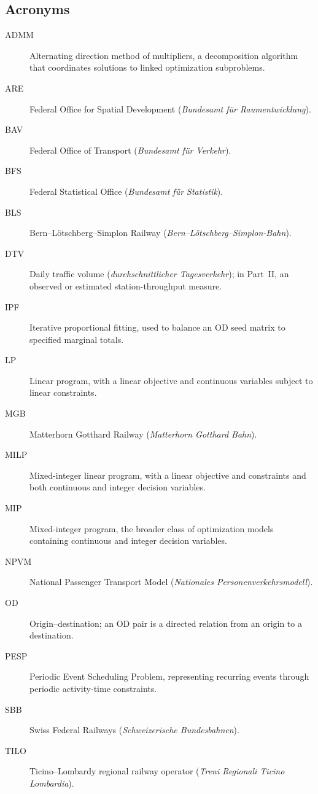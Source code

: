 \documentclass[preprint,12pt]{elsarticle}
\begin{document}
\subsection*{Acronyms}
\begin{description}
    \item[ADMM] Alternating direction method of multipliers, a decomposition algorithm that coordinates solutions to linked optimization subproblems.
    \item[ARE] Federal Office for Spatial Development (\textit{Bundesamt für Raumentwicklung}).
    \item[BAV] Federal Office of Transport (\textit{Bundesamt für Verkehr}).
    \item[BFS] Federal Statistical Office (\textit{Bundesamt für Statistik}).
    \item[BLS] Bern--Lötschberg--Simplon Railway (\textit{Bern--Lötschberg--Simplon-Bahn}).
    \item[DTV] Daily traffic volume (\textit{durchschnittlicher Tagesverkehr}); in Part~II, an observed or estimated station-throughput measure.
    \item[IPF] Iterative proportional fitting, used to balance an OD seed matrix to specified marginal totals.
    \item[LP] Linear program, with a linear objective and continuous variables subject to linear constraints.
    \item[MGB] Matterhorn Gotthard Railway (\textit{Matterhorn Gotthard Bahn}).
    \item[MILP] Mixed-integer linear program, with a linear objective and constraints and both continuous and integer decision variables.
    \item[MIP] Mixed-integer program, the broader class of optimization models containing continuous and integer decision variables.
    \item[NPVM] National Passenger Transport Model (\textit{Nationales Personenverkehrsmodell}).
    \item[OD] Origin--destination; an OD pair is a directed relation from an origin to a destination.
    \item[PESP] Periodic Event Scheduling Problem, representing recurring events through periodic activity-time constraints.
    \item[SBB] Swiss Federal Railways (\textit{Schweizerische Bundesbahnen}).
    \item[TILO] Ticino--Lombardy regional railway operator (\textit{Treni Regionali Ticino Lombardia}).
\end{description}
\newpage
\end{document}
